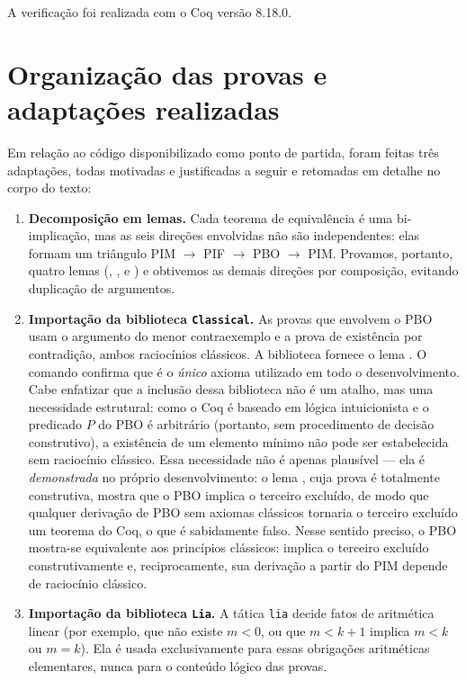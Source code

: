 \documentclass{article}
\begin{document}
A verificação foi realizada com o Coq versão 8.18.0.

\section*{Organização das provas e adaptações realizadas}

Em relação ao código disponibilizado como ponto de partida, foram
feitas três adaptações, todas motivadas e justificadas a seguir e
retomadas em detalhe no corpo do texto:

\begin{enumerate}
  \item \textbf{Decomposição em lemas.} Cada teorema de equivalência
    é uma bi-implicação, mas as seis direções envolvidas não são
    independentes: elas formam um triângulo
    PIM $\to$ PIF $\to$ PBO $\to$ PIM. Provamos, portanto, quatro
    lemas (,
    ,  e
    ) e obtivemos as demais direções
    por composição, evitando duplicação de argumentos.
  \item \textbf{Importação da biblioteca \texttt{Classical}.} As
    provas que envolvem o PBO usam o argumento do menor
    contraexemplo e a prova de existência por contradição, ambos
    raciocínios clássicos. A biblioteca fornece o lema
    . O comando 
    confirma que  é o \emph{único} axioma
    utilizado em todo o desenvolvimento. Cabe enfatizar que a
    inclusão dessa biblioteca não é um atalho, mas uma necessidade
    estrutural: como o Coq é baseado em lógica intuicionista e o
    predicado $P$ do PBO é arbitrário (portanto, sem procedimento de
    decisão construtivo), a existência de um elemento mínimo não
    pode ser estabelecida sem raciocínio clássico. Essa necessidade
    não é apenas plausível --- ela é \emph{demonstrada} no próprio
    desenvolvimento: o lema , cuja
    prova é totalmente construtiva, mostra que o PBO implica o
    terceiro excluído, de modo que qualquer derivação de PBO sem
    axiomas clássicos tornaria o terceiro excluído um teorema do
    Coq, o que é sabidamente falso. Nesse sentido preciso, o PBO
    mostra-se equivalente aos princípios clássicos: implica o
    terceiro excluído construtivamente e, reciprocamente, sua
    derivação a partir do PIM depende de raciocínio clássico.
  \item \textbf{Importação da biblioteca \texttt{Lia}.} A tática
    \texttt{lia} decide fatos de aritmética linear (por exemplo,
    que não existe $m < 0$, ou que $m < k+1$ implica $m < k$ ou
    $m = k$). Ela é usada exclusivamente para essas obrigações
    aritméticas elementares, nunca para o conteúdo lógico das
    provas.
\end{enumerate}
\end{document}
